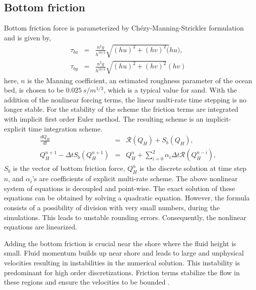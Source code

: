 \subsection{Bottom friction}
Bottom friction force is parameterized by Ch\'ezy-Manning-Strickler formulation  \cite{gourgue2009flux} and is given by,
\begin{eqnarray}
\tau_{bx} &=& \frac{n^2 g}{h^{10/3}}\sqrt{(hu)^2+(hv)^2(}hu), \nonumber \\
\tau_{by} &=& \frac{n^2 g}{h^{10/3}}\sqrt{(hu)^2+(hv)^2}(hv)
\end{eqnarray}
here, $n$  is the Manning coefficient, an estimated roughness parameter of the ocean bed, is chosen to be $0.025~ s/m^{1/3}$, which is a typical value for sand. With the addition of the nonlinear forcing terms, the linear multi-rate time stepping is no longer stable. For the stability of the scheme the friction terms are integrated with implicit first order Euler method. The resulting scheme is an implicit-explicit time integration scheme. \begin{eqnarray}
\frac{dQ_H}{dt} &=& \mathcal{R}(Q_H) + S_b(Q_H),  \nonumber \\
Q_H^{n+1} -  \Delta t S_b\left(Q_{H} ^{n+1}\right) &=& Q_{H}^n + \sum_{i=0}^{2} \alpha_i\Delta t\mathcal{R}\left(Q_H ^{n-i}\right),
\end{eqnarray}
$S_b$ is the vector of bottom friction force, $Q_H ^n$ is the discrete solution at time step $n$, and  $\alpha_i$'s are coefficients of explicit multi-rate scheme. The above nonlinear system of equations is decoupled and point-wise. The exact solution of these equations can be obtained by solving a quadratic equation. However, the formula consists of a possibility of division with very small numbers, during the simulations. This leads to unstable rounding errors. Consequently, the nonlinear equations are linearized. %

Adding the bottom friction is crucial near the shore where the fluid height is small. Fluid momentum builds up near shore and leads to large and unphysical velocities resulting in instabilities in the numerical solution. This instability is predominant for high order discretizations. Friction terms stabilize the flow in these regions and ensure the velocities to be bounded \cite{leveque2011tsunami}. 

